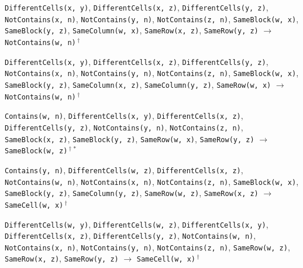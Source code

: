 \documentclass[11pt,a4paper]{article}
\theoremstyle{definition}
\theoremstyle{remark}
\begin{document}
{\begin{enumerate}[label={[\arabic*]},leftmargin=2.6em,itemsep=1pt]
  \item \texttt{DifferentCells(x,~y)}, \allowbreak \texttt{DifferentCells(x,~z)}, \allowbreak \texttt{DifferentCells(y,~z)}, \allowbreak \texttt{NotContains(x,~n)}, \allowbreak \texttt{NotContains(y,~n)}, \allowbreak \texttt{NotContains(z,~n)}, \allowbreak \texttt{SameBlock(w,~x)}, \allowbreak \texttt{SameBlock(y,~z)}, \allowbreak \texttt{SameColumn(w,~x)}, \allowbreak \texttt{SameRow(x,~z)}, \allowbreak \texttt{SameRow(y,~z)} \;$\to$\; \texttt{NotContains(w,~n)}\,$^{\dagger}$
  \item \texttt{DifferentCells(x,~y)}, \allowbreak \texttt{DifferentCells(x,~z)}, \allowbreak \texttt{DifferentCells(y,~z)}, \allowbreak \texttt{NotContains(x,~n)}, \allowbreak \texttt{NotContains(y,~n)}, \allowbreak \texttt{NotContains(z,~n)}, \allowbreak \texttt{SameBlock(w,~x)}, \allowbreak \texttt{SameBlock(y,~z)}, \allowbreak \texttt{SameColumn(x,~z)}, \allowbreak \texttt{SameColumn(y,~z)}, \allowbreak \texttt{SameRow(w,~x)} \;$\to$\; \texttt{NotContains(w,~n)}\,$^{\dagger}$
  \item \texttt{Contains(w,~n)}, \allowbreak \texttt{DifferentCells(x,~y)}, \allowbreak \texttt{DifferentCells(x,~z)}, \allowbreak \texttt{DifferentCells(y,~z)}, \allowbreak \texttt{NotContains(y,~n)}, \allowbreak \texttt{NotContains(z,~n)}, \allowbreak \texttt{SameBlock(x,~z)}, \allowbreak \texttt{SameBlock(y,~z)}, \allowbreak \texttt{SameRow(w,~x)}, \allowbreak \texttt{SameRow(y,~z)} \;$\to$\; \texttt{SameBlock(w,~z)}\,$^{\dagger}$\,$^{\ast}$
  \item \texttt{Contains(y,~n)}, \allowbreak \texttt{DifferentCells(w,~z)}, \allowbreak \texttt{DifferentCells(x,~z)}, \allowbreak \texttt{NotContains(w,~n)}, \allowbreak \texttt{NotContains(x,~n)}, \allowbreak \texttt{NotContains(z,~n)}, \allowbreak \texttt{SameBlock(w,~x)}, \allowbreak \texttt{SameBlock(y,~z)}, \allowbreak \texttt{SameColumn(y,~z)}, \allowbreak \texttt{SameRow(w,~z)}, \allowbreak \texttt{SameRow(x,~z)} \;$\to$\; \texttt{SameCell(w,~x)}\,$^{\dagger}$
  \item \texttt{DifferentCells(w,~y)}, \allowbreak \texttt{DifferentCells(w,~z)}, \allowbreak \texttt{DifferentCells(x,~y)}, \allowbreak \texttt{DifferentCells(x,~z)}, \allowbreak \texttt{DifferentCells(y,~z)}, \allowbreak \texttt{NotContains(w,~n)}, \allowbreak \texttt{NotContains(x,~n)}, \allowbreak \texttt{NotContains(y,~n)}, \allowbreak \texttt{NotContains(z,~n)}, \allowbreak \texttt{SameRow(w,~z)}, \allowbreak \texttt{SameRow(x,~z)}, \allowbreak \texttt{SameRow(y,~z)} \;$\to$\; \texttt{SameCell(w,~x)}\,$^{\dagger}$

\end{enumerate}}
\end{document}
